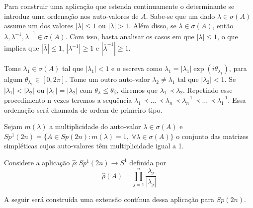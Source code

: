 \documentclass[12pt]{book}
\newcommand{\circulo}{S^{1}}
\newcommand{\espectrooperador}[1]{\sigma(#1)}
\newcommand{\gruposimpletico}[1]{Sp(#1)}
\newcommand{\gruposimpleticoespecial}[1]{Sp^{1}(#1)}
\begin{document}
	Para construir uma aplicação que estenda continuamente o determinante se introduz uma ordenação nos auto-valores de $A$. Sabe-se que um dado $\lambda \in \espectrooperador{A}$ assume um dos valores $|\lambda|\leq 1$ ou $|\lambda|>1$. Além disso, se $\lambda \in \espectrooperador{A}$, então $\overline{\lambda}, \lambda^{-1}, \overline{\lambda}^{-1} \in \espectrooperador{A}$. Com isso, basta analisar os casos em que $|\lambda| \leq 1$, o que implica que $|\overline{\lambda}|\leq 1$, $|\lambda^{-1}|\geq 1$ e $|\overline{\lambda}^{-1}|\geq 1$.
	
	Tome $\lambda_{1}\in \sigma(A)$ tal que $|\lambda_{1}|<1$ e o escreva como $\lambda_{1} = |\lambda_{1}|\exp(i\theta_{\lambda_{1}})$, para algum $\theta_{\lambda_{1}} \in [0,2\pi]$. Tome um outro auto-valor $\lambda_{2}\neq \lambda_{1}$ tal que $|\lambda_{2}|<1$. Se $|\lambda_{1}| < |\lambda_{2}|$ ou  $|\lambda_{1}|= |\lambda_{2}|$ com $\theta_{\lambda} \leq \theta_{\beta}$, diremos que $\lambda_{1} \prec \lambda_{2}$. Repetindo esse procedimento n-vezes teremos a sequência $\lambda_{1} \prec \dots \prec \lambda_{n} \prec  \lambda_{n}^{-1} \prec \dots \prec \lambda_{1}^{-1}$. Essa ordenação será chamada de ordem de primeiro tipo.
	
	Sejam $m(\lambda)$ a multiplicidade do auto-valor $\lambda \in \espectrooperador{A}$  e $\gruposimpleticoespecial{2n} =\{A\in \gruposimpletico{2n} : m(\lambda) = 1,\;\forall \lambda\in \sigma(A) \}$ o conjunto das matrizes simpléticas cujos auto-valores têm multiplicidade igual a 1.
	
	Considere a aplicação $\hat{\rho}:\gruposimpleticoespecial{2n} \to \circulo$ definida por 
	$$
		\hat{\rho}(A) = \prod_{j=1}^{n}\frac{\lambda_{j}}{|\lambda_{j}|}
	$$
	
	A seguir será construída uma extensão contínua dessa aplicação para $\gruposimpletico{2n}$.
	
\end{document}
